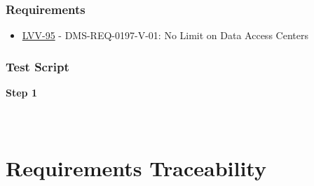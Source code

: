 \hypertarget{requirements-189}{%
\subsubsection{Requirements}\label{requirements-189}}

\begin{itemize}
\tightlist
\item
  \href{https://jira.lsstcorp.org/browse/LVV-95}{LVV-95} -
  DMS-REQ-0197-V-01: No Limit on Data Access Centers
\end{itemize}

\hypertarget{test-script-189}{%
\subsubsection{Test Script}\label{test-script-189}}

\textbf{Step 1}\\
~\\
~\\

\hypertarget{requirements-traceability}{%
\section{Requirements Traceability}\label{requirements-traceability}}

